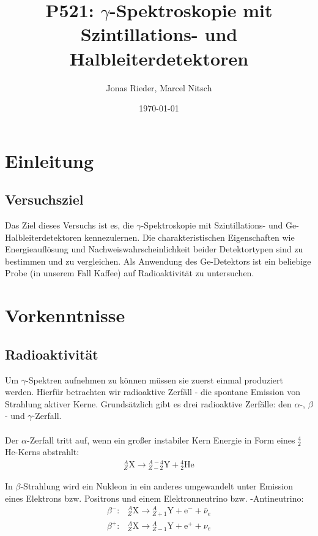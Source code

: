 \documentclass[12pt,a4paper,titlepage]{article}
\author{Jonas Rieder, Marcel Nitsch}
\date{\today}
\title{P521: $\gamma$-Spektroskopie mit Szintillations- und Halbleiterdetektoren}
\begin{document}
\maketitle

\newpage

\section{Einleitung}

\subsection{Versuchsziel}

\noindent Das Ziel dieses Versuchs ist es, die $\gamma$-Spektroskopie mit Szintillations- und Ge-Halbleiterdetektoren kennezulernen. Die charakteristischen Eigenschaften wie Energieauflösung und Nachweiswahrscheinlichkeit beider Detektortypen sind zu bestimmen und zu vergleichen. Als Anwendung des Ge-Detektors ist ein beliebige Probe (in unserem Fall Kaffee) auf Radioaktivität zu untersuchen.

\section{Vorkenntnisse}

\subsection{Radioaktivität}

\noindent Um $\gamma$-Spektren aufnehmen zu können müssen sie zuerst einmal produziert werden. Hierfür betrachten wir radioaktive Zerfäll - die spontane Emission von Strahlung aktiver Kerne. Grundsätzlich gibt es drei radioaktive Zerfälle: den $\alpha$-, $\beta$- und $\gamma$-Zerfall. \\\\

\indent Der $\alpha$-Zerfall tritt auf, wenn ein großer instabiler Kern Energie in Form eines $^4_2$He-Kerns abstrahlt:
\begin{align}
^A_Z\text{X} \rightarrow {^{A-4}_{Z-2}\text{Y}} + {^4_2\text{He}}
\end{align}

\indent In $\beta$-Strahlung wird ein Nukleon in ein anderes umgewandelt unter Emission eines Elektrons bzw. Positrons und einem Elektronneutrino bzw. -Antineutrino:
\begin{align}
			\beta^-: & {^A_Z\text{X}} \rightarrow {^A_{Z+1}\text{Y}} + \text{e}^- + \bar{\nu}_e\\
			\beta^+: & {^A_Z\text{X}} \rightarrow {^A_{Z-1}\text{Y}} + \text{e}^+ + \nu_e
\end{align}
\end{document}
